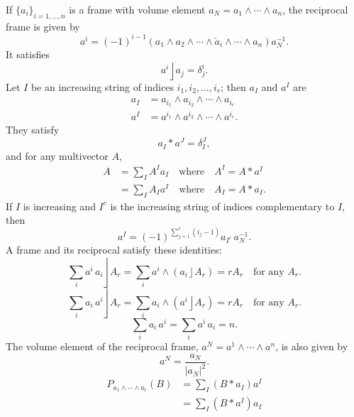 \documentclass{utarticle}
\DeclareMathOperator{\lin}{\rfloor}
\DeclareMathOperator{\out}{\wedge}
\newcommand{\scprod}[2]{\ensuremath{#1 * #2}}
\begin{document}
If $\{a_i\}_{i=1,\dotsc,n}$ is a frame with volume element $a_N = a_1 \out \dotsb 
\out a_n$, the reciprocal frame is given by
\begin{equation}
a^i = (-1)^{i-1} (a_1 \out a_2 \out \dotsb \out \check{a}_i \out 
           \dotsb \out a_n) a_N^{-1}.
\end{equation}
It satisfies
\begin{equation} a^i \lin a_j = \delta^i_j.  \end{equation}
Let $I$ be an increasing string of indices $i_1, i_2, \dotsc, i_r$; then $a_I$ and $a^I$ are
\begin{align} 
a_I & = a_{i_1} \out a_{i_2} \out \dotsb \out a_{i_r} \\
a^I & = a^{i_1} \out a^{i_2} \out \dotsb \out a^{i_r}. 
\end{align}
They satisfy
\begin{equation} \scprod{a_I}{a^J} = \delta_I^J, \end{equation}
and for any multivector $A$,
\begin{align}
A & = \sum_I A^I a_I  \quad \text{where}  \quad A^I = \scprod{A}{a^I} \\
   & = \sum_I A_I a^I   \quad \text{where}  \quad A_I = \scprod{A}{a_I}.
\end{align}
If $I$ is increasing and $I^c$ is the increasing string of indices complementary to $I$, then
\begin{equation} a^I = (-1)^{\sum_{j=1}^r(i_j-1)} a_{I^c} \, a_N^{-1}. \end{equation}
A frame and its reciprocal satisfy these identities:
\begin{equation} 
\sum_i a^i \, a_i \lin A_r = \sum_i a^i \out (a_i \lin A_r)  = r A_r  \quad \text{for any $A_r$.} 
\end{equation}
\begin{equation} 
\sum_i a_i \, a^i \lin A_r = \sum_i a_i \out (a^i \lin A_r)  = r A_r  \quad \text{for any $A_r$.} 
\end{equation}
\begin{equation} \sum_i a_i\,a^i = \sum_i a^i\,a_i = n. \end{equation}
The volume element of the reciprocal frame, $a^N = a^1 \out \dotsb 
\out a^n$, is also given by
\begin{equation} a^N = \frac{a_N}{|a_N|^2}. \end{equation}
\begin{align}
P_{a_1 \out \dotsb \out a_r}(B) & = \sum_I (\scprod{B}{a_I}) a^I \\
                                                       & = \sum_I (\scprod{B}{a^I}) a_I 
\end{align}
\end{document}
